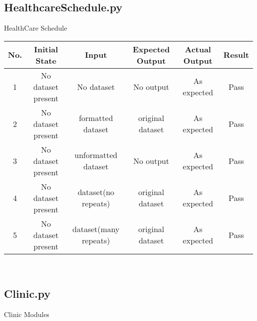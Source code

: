 \documentclass[12pt]{article}
\begin{document}

\quad

\quad

\quad



\subsection{HealthcareSchedule.py}


\vspace{-5pt}

HealthCare Schedule

\vspace{10pt}

\begin{tabular}{|c|c|c|c|c|c|}
\hline
\textbf{No.}  & \textbf{Initial State} & \textbf{Input} & \textbf{Expected Output} & \textbf{Actual Output} & \textbf{Result}
\\ \hline
1  & No dataset present & No dataset & No output & As expected & Pass
\\ \hline
2  & No dataset present & formatted dataset & original dataset & As expected & Pass
\\ \hline
3  & No dataset present & unformatted dataset & No output & As expected & Pass
\\ \hline
4  & No dataset present & dataset(no repeats) & original dataset & As expected & Pass
\\ \hline
5  & No dataset present & dataset(many repeats) & original dataset & As expected & Pass
\\ \hline
\end{tabular}\\





\quad

\quad

\quad



\subsection{Clinic.py}


\vspace{-5pt}

Clinic Modules

\vspace{10pt}
\end{document}
